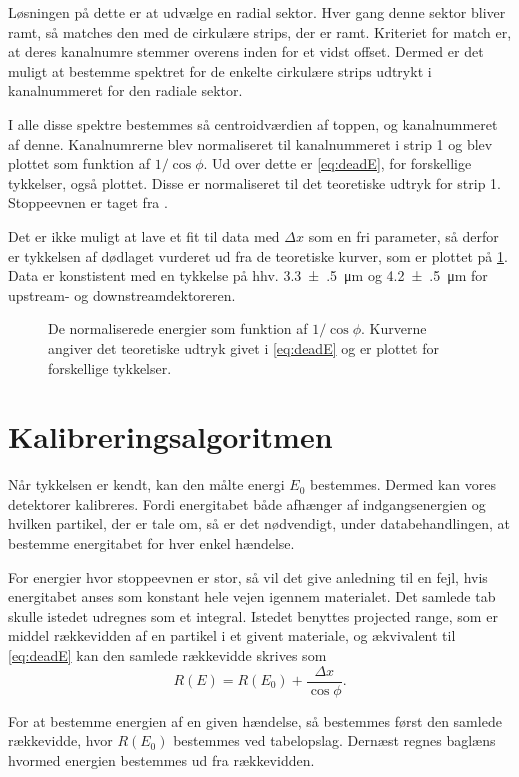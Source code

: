 Løsningen på dette er at udvælge en radial sektor. Hver gang denne sektor bliver ramt, så matches
den med de cirkulære strips, der er ramt. Kriteriet for match er, at deres kanalnumre stemmer
overens inden for et vidst offset. Dermed er det muligt at bestemme spektret for de enkelte
cirkulære strips udtrykt i kanalnummeret for den radiale sektor.

I alle disse spektre bestemmes så centroidværdien af \Pu toppen, og kanalnummeret af denne.
Kanalnumrerne blev normaliseret til kanalnummeret i strip 1 og blev plottet som funktion af
$1/{\cos \phi}$. Ud over dette er \cref{eq:deadE}, for forskellige tykkelser, også plottet. Disse er
normaliseret til det teoretiske udtryk for strip 1. Stoppeevnen er taget fra \cite{Ziegler}.

Det er ikke muligt at lave et fit til data med $\Delta x$ som en fri parameter, så derfor er tykkelsen af
dødlaget vurderet ud fra de teoretiske kurver, som er plottet på \cref{fig:dead}. Data er
konstistent med en tykkelse på hhv. \SI{3.3(5)}{\um} og \SI{4.2(5)}{\um} for upstream- og
downstreamdektoreren.

\begin{figure}[h]
  \centering
  \hfill
  \caption{De normaliserede energier som funktion af $1/{\cos\phi}$. Kurverne angiver det teoretiske
    udtryk givet i \cref{eq:deadE} og er plottet for forskellige tykkelser.}
  \label{fig:dead}
\end{figure}


\section{Kalibreringsalgoritmen}
\label{sec:kalalgo}

Når tykkelsen er kendt, kan den målte energi $E_{0}$ bestemmes. Dermed kan vores detektorer
kalibreres. Fordi energitabet både afhænger af indgangsenergien og hvilken partikel, der er tale om,
så er det nødvendigt, under databehandlingen, at bestemme energitabet for hver enkel hændelse.

For energier hvor stoppeevnen er stor, så vil det give anledning til en fejl, hvis energitabet anses
som konstant hele vejen igennem materialet. Det samlede tab skulle istedet udregnes som et
integral. Istedet benyttes projected range, som er middel rækkevidden af en partikel i et givent
materiale, og ækvivalent til \cref{eq:deadE} kan den samlede rækkevidde skrives som
\begin{equation}
  \label{eq:deadR}
  R(E) = R(E_{0}) + \frac{\Delta x}{\cos \phi} .
\end{equation}

For at bestemme energien af en given hændelse, så bestemmes først den samlede rækkevidde, hvor
$R(E_{0})$ bestemmes ved tabelopslag. Dernæst regnes baglæns hvormed energien bestemmes ud fra
rækkevidden. 











